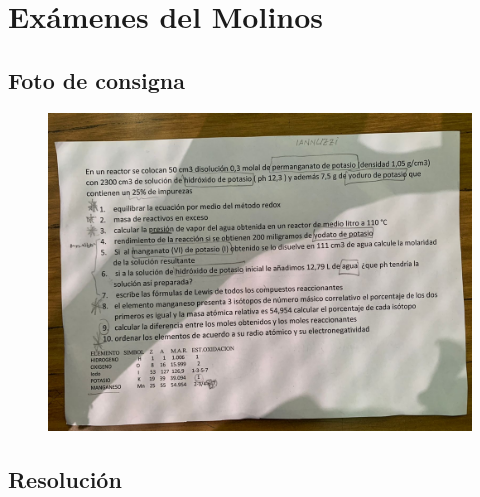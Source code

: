 \section{Exámenes del Molinos}

\subsection*{Foto de consigna}
\begin{figure}[H]
    \centering
    \includegraphics[width=0.7\linewidth, angle=90]{Images/molinos_examen1.jpg}
\end{figure}

\subsection*{Resolución}

